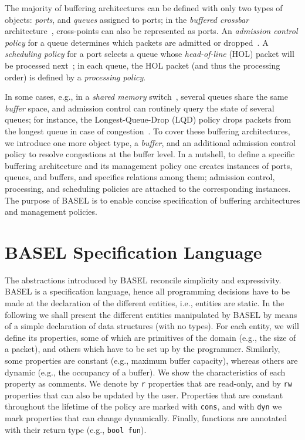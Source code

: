\documentclass{article}
\newcommand{\barch}{BASEL}
\begin{document}
The majority of buffering architectures can be defined with only two types of objects: \emph{ports}, and \emph{queues} 
assigned to ports; in the \emph{buffered crossbar} architecture~\cite{KeslassyKSS12}, cross-points
can also be represented as ports. An \emph{admission control policy}
for a queue determines which packets are admitted or
dropped~\cite{FloydJ93,FengSKS02,NicholsJ12}. A \emph{scheduling
  policy} for a port selects a queue whose \emph{head-of-line} (HOL)
packet will be processed next~\cite{DemersKS89,McKenney90}; in each
queue, the HOL packet (and thus the processing order) is defined by a \emph{processing policy}. 

In some cases, e.g., in a \emph{shared memory} switch~\cite{AielloKM08}, several queues share the same \emph{buffer} 
space, and admission control can routinely query the state of several queues; 
for instance, the Longest-Queue-Drop (LQD) policy drops packets from the longest queue in case of congestion~\cite{AielloKM08}. 
To cover these buffering architectures, we introduce one more object type, a \emph{buffer},
and an additional admission control policy to resolve congestions at the buffer level.
In a nutshell, to define a specific buffering architecture and its
management policy one creates instances of ports, queues, and
buffers, and specifies relations among them; admission control,
processing, and scheduling policies are attached to the corresponding
instances.
The purpose of \barch{} is to enable concise specification of buffering architectures and management policies.

\section{\barch{} Specification Language}\label{sec:barch-specification}

The abstractions introduced by \barch{} reconcile simplicity and expressivity.
\barch{} is a specification language, hence all programming decisions have to be made at the declaration of the different
entities, i.e., entities are static. 
In the following we shall present the different entities manipulated by \barch{} by means of a simple declaration of data structures (with no types). For each entity, we will define its properties, some of which are primitives of the domain (e.g., the size of a packet), and others which have to be set up by the programmer. Similarly, some properties are constant (e.g., maximum buffer capacity), whereas others are dynamic (e.g., the occupancy of a buffer). We show the characteristics of each property as comments. We denote by \lstinline|r| properties that are read-only, and by \lstinline|rw| properties that can also be updated by the user. Properties that are constant throughout the lifetime of the policy are marked with \lstinline|cons|, and with \lstinline|dyn| we mark properties that can change dynamically. Finally, functions are annotated with their return type (e.g., \lstinline|bool fun|). 
\end{document}
